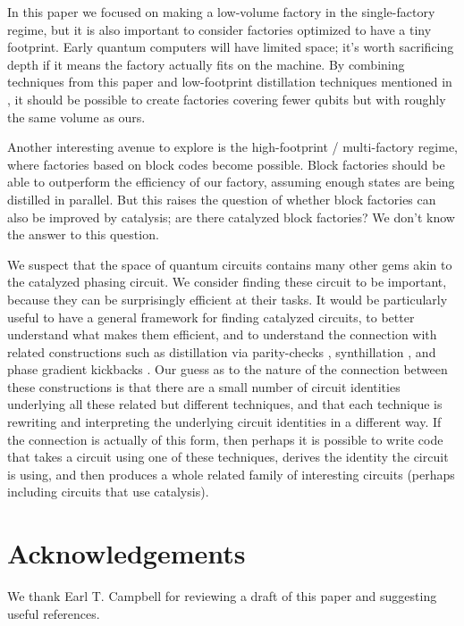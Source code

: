 \documentclass[superscriptaddress,notitlepage,longbibliography]{revtex4-1}
\begin{document}
In this paper we focused on making a low-volume factory in the single-factory regime, but it is also important to consider factories optimized to have a tiny footprint.
Early quantum computers will have limited space; it's worth sacrificing depth if it means the factory actually fits on the machine.
By combining techniques from this paper and low-footprint distillation techniques mentioned in \cite{litinski2018}, it should be possible to create factories covering fewer qubits but with roughly the same volume as ours.

Another interesting avenue to explore is the high-footprint / multi-factory regime, where factories based on block codes become possible.
Block factories should be able to outperform the efficiency of our factory, assuming enough states are being distilled in parallel.
But this raises the question of whether block factories can also be improved by catalysis; are there catalyzed block factories?
We don't know the answer to this question.

We suspect that the space of quantum circuits contains many other gems akin to the catalyzed phasing circuit.
We consider finding these circuit to be important, because they can be surprisingly efficient at their tasks.
It would be particularly useful to have a general framework for finding catalyzed circuits, to better understand what makes them efficient, and to understand the connection with related constructions such as distillation via parity-checks \cite{campbell2018}, synthillation \cite{campbell2017}, and phase gradient kickbacks \cite{kitaev2002, gidney2018, nam2018}.
Our guess as to the nature of the connection between these constructions is that there are a small number of circuit identities underlying all these related but different techniques, and that each technique is rewriting and interpreting the underlying circuit identities in a different way.
If the connection is actually of this form, then perhaps it is possible to write code that takes a circuit using one of these techniques, derives the identity the circuit is using, and then produces a whole related family of interesting circuits (perhaps including circuits that use catalysis).


\section{Acknowledgements}

We thank Earl T. Campbell for reviewing a draft of this paper and suggesting useful references.
\end{document}
